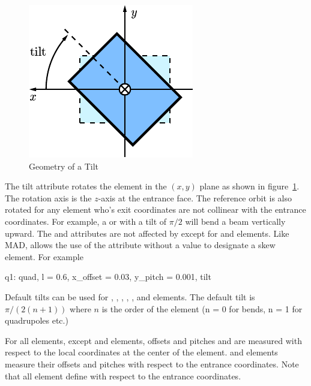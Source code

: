 \begin{figure}[t]
  \centering
  \includegraphics{tilt.pdf}
  \caption{Geometry of a Tilt}
  \label{f:tilt}
\end{figure}

The tilt attribute rotates the element in the $(x, y)$ plane as shown
in figure~\ref{f:tilt}. The rotation axis is the $z$-axis at the
entrance face. The reference orbit is also rotated for any element
who's exit coordinates are not collinear with the entrance
coordinates. For example, a  or  with a tilt of
$\pi/2$ will bend a beam vertically upward. The  and
 attributes are not affected by  except for
 and  elements. Like MAD, \bmad allows the
use of the  attribute without a value to designate a skew
element. For example
\begin{example}
  q1: quad, l = 0.6, x_offset = 0.03, y_pitch = 0.001, tilt
\end{example}
Default tilts can be used for , , ,
, , and  elements.
The default tilt is $\pi/(2(n+1))$ where $n$ is the order of the 
element (n = 0 for bends, n = 1 for quadrupoles etc.) 

For all elements, except  and  elements,
offsets and pitches and are measured with respect to the local coordinates at the
center of the element.  and  elements measure
their offsets and pitches with respect to the entrance coordinates.
Note that all element define  with respect to the entrance
coordinates.

